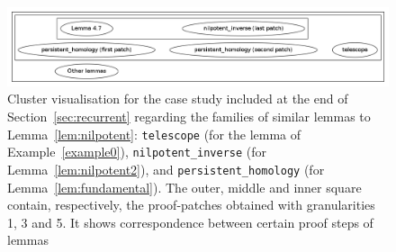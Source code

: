 \begin{figure}
\centering
\includegraphics[scale=.3]{clustervisualisation.png}
\caption{Cluster visualisation for the case study included at the end of Section~\ref{sec:recurrent} regarding the families of similar lemmas to Lemma~\ref{lem:nilpotent}: \texttt{telescope} (for the lemma of Example~\ref{example0}), \texttt{nilpotent\_inverse} (for Lemma~\ref{lem:nilpotent2}), and \texttt{persistent\_homology}
(for Lemma~\ref{lem:fundamental}). The outer, middle and inner square contain, respectively, the proof-patches obtained with granularities 1, 3 and 5. It shows correspondence between certain proof steps of lemmas
}\label{fig:clustervisualisation}
\end{figure}
